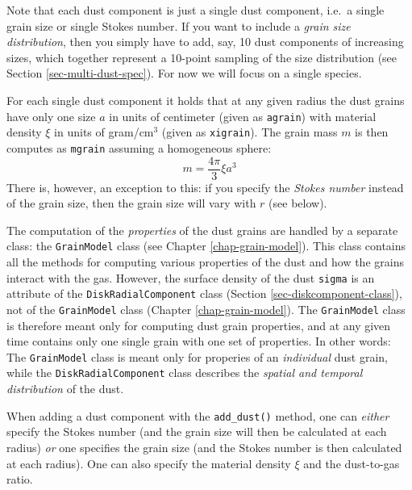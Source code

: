 \documentclass{book}
\newcommand{\code}[1]{{\small\tt #1}}
\begin{document}
Note that each dust component is just a single dust component, i.e.~a single
grain size or single Stokes number. If you want to include a {\em grain size
  distribution}, then you simply have to add, say, 10 dust components of
increasing sizes, which together represent a 10-point sampling of the size
distribution (see Section \ref{sec-multi-dust-spec}). For now we will focus on a
single species.

For each single dust component it holds that at any given radius the dust grains
have only one size $a$ in units of centimeter (given as \code{agrain}) with
material density $\xi$ in units of gram/cm$^3$ (given as \code{xigrain}).  The
grain mass $m$ is then computes as \code{mgrain} assuming a homogeneous sphere:
\begin{equation}
m=\frac{4\pi}{3}\xi a^3
\end{equation}
There is, however, an exception to this: if you specify the {\em Stokes number}
instead of the grain size, then the grain size will vary with $r$ (see below).

The computation of the {\em properties} of the dust grains are handled by a
separate class: the \code{GrainModel} class (see Chapter
\ref{chap-grain-model}). This class contains all the methods for computing
various properties of the dust and how the grains interact with the gas.
However, the surface density of the dust \code{sigma} is an attribute of the
\code{DiskRadialComponent} class (Section \ref{sec-diskcomponent-class}), not of the
\code{GrainModel} class (Chapter \ref{chap-grain-model}).  The
\code{GrainModel} class is therefore meant only for
computing dust grain properties, and at any given time contains only one single grain
with one set of properties. In other words: The \code{GrainModel} class is
meant only for properies of an {\em individual} dust grain, while the
\code{DiskRadialComponent} class describes the {\em spatial and temporal distribution}
of the dust.

When adding a dust component with the \code{add\_dust()} method, one can {\em
  either} specify the Stokes number (and the grain size will then be calculated
at each radius) {\em or} one specifies the grain size (and the Stokes number is
then calculated at each radius). One can also specify the material density $\xi$
and the dust-to-gas ratio.
\end{document}
